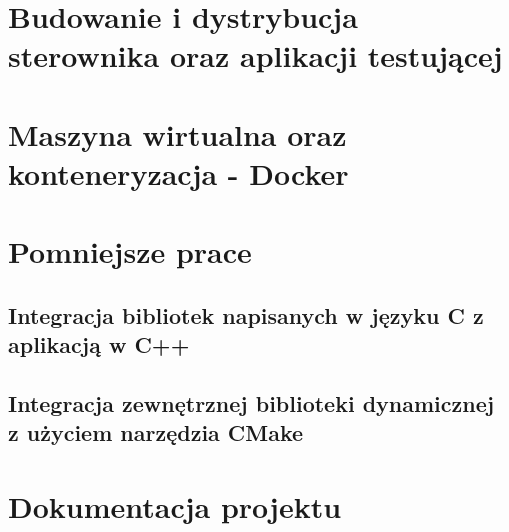 \newpage
\section{Budowanie i dystrybucja sterownika oraz aplikacji testującej}

\newpage
\section{Maszyna wirtualna oraz konteneryzacja - Docker}

\newpage
\section{Pomniejsze prace}
\subsection{Integracja bibliotek napisanych w języku C z aplikacją w C++}
\subsection{Integracja zewnętrznej biblioteki dynamicznej z użyciem narzędzia CMake}

\newpage
\section{Dokumentacja projektu}


